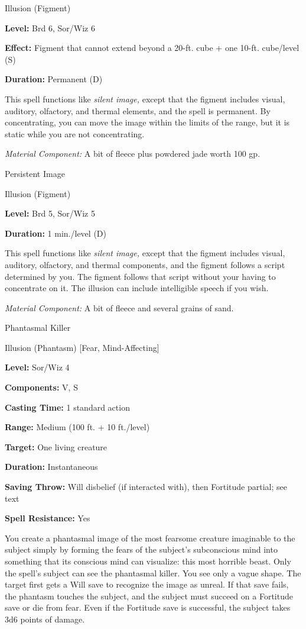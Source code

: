 \documentclass{article}
\begin{document}
Illusion (Figment)

\textbf{Level:} Brd 6, Sor/Wiz 6

\textbf{Effect:} Figment that cannot extend beyond a 20-ft. cube + one 10-ft. cube/level 
(S)

\textbf{Duration:} Permanent (D)

This spell functions like \textit{silent image, }except that the figment includes 
visual, auditory, olfactory, and thermal elements, and the spell is permanent. 
By concentrating, you can move the image within the limits of the range, but it 
is static while you are not concentrating.

\textit{Material Component: }A bit of fleece plus powdered jade worth 100 gp.

\vspace{12pt}
Persistent Image

Illusion (Figment)

\textbf{Level:} Brd 5, Sor/Wiz 5

\textbf{Duration:} 1 min./level (D)

This spell functions like \textit{silent image, }except that the figment includes 
visual, auditory, olfactory, and thermal components, and the figment follows a 
script determined by you. The figment follows that script without your having to 
concentrate on it. The illusion can include intelligible speech if you wish. 

\textit{Material Component: }A bit of fleece and several grains of sand.

\vspace{12pt}
Phantasmal Killer

Illusion (Phantasm) [Fear, Mind-Affecting]

\textbf{Level:} Sor/Wiz 4

\textbf{Components:} V, S

\textbf{Casting Time:} 1 standard action

\textbf{Range: }Medium (100 ft. + 10 ft./level)

\textbf{Target:} One living creature

\textbf{Duration:} Instantaneous

\textbf{Saving Throw: }Will disbelief (if interacted with), then Fortitude partial; 
see text

\textbf{Spell Resistance:} Yes

You create a phantasmal image of the most fearsome creature imaginable to the subject 
simply by forming the fears of the subject's subconscious mind into something that 
its conscious mind can visualize: this most horrible beast. Only the spell's subject 
can see the phantasmal killer. You see only a vague shape. The target first gets 
a Will save to recognize the image as unreal. If that save fails, the phantasm 
touches the subject, and the subject must succeed on a Fortitude save or die from 
fear. Even if the Fortitude save is successful, the subject takes 3d6 points of 
damage.
\end{document}
